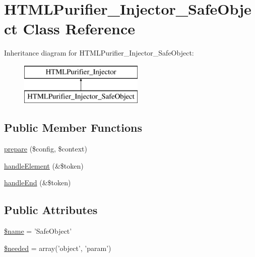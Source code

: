 \hypertarget{classHTMLPurifier__Injector__SafeObject}{\section{H\+T\+M\+L\+Purifier\+\_\+\+Injector\+\_\+\+Safe\+Object Class Reference}
\label{classHTMLPurifier__Injector__SafeObject}
}
Inheritance diagram for H\+T\+M\+L\+Purifier\+\_\+\+Injector\+\_\+\+Safe\+Object\+:\begin{figure}[H]
\begin{center}
\leavevmode
\includegraphics[height=2.000000cm]{classHTMLPurifier__Injector__SafeObject}
\end{center}
\end{figure}
\subsection*{Public Member Functions}
\begin{DoxyCompactItemize}
\item 
\hyperlink{classHTMLPurifier__Injector__SafeObject_a6626b8a214f84f5bdecb8a675792a7c3}{prepare} (\$config, \$context)
\item 
\hyperlink{classHTMLPurifier__Injector__SafeObject_a32eee1bdc9811365029de88fac88ac9c}{handle\+Element} (\&\$token)
\item 
\hyperlink{classHTMLPurifier__Injector__SafeObject_aff45da95b058cdfd7c69d6872c4369a3}{handle\+End} (\&\$token)
\end{DoxyCompactItemize}
\subsection*{Public Attributes}
\begin{DoxyCompactItemize}
\item 
\hyperlink{classHTMLPurifier__Injector__SafeObject_a84f42995caf73f2ce757e3f4b9170602}{\$name} = 'Safe\+Object'
\item 
\hyperlink{classHTMLPurifier__Injector__SafeObject_ad361a1c14e9d819760f17572d1b74117}{\$needed} = array('object', 'param')
\end{DoxyCompactItemize}
